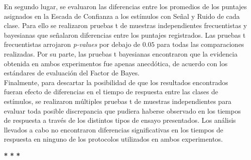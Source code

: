 En segundo lugar, se evaluaron las diferencias entre los promedios de los puntajes asignados en la Escada de Confianza a los estímulos con Señal y Ruido de cada clase. Para ello se realizaron pruebas t de muestras independientes frecuentistas y bayesianas que señalaron diferencias entre los puntajes registrados. Las pruebas t frecuentistas arrojaron \textit{p-values} por debajo de $0.05$ para todas las comparaciones realizadas. Por su parte, las pruebas t bayesianas encontraron que la evidencia obtenida en ambos experimentos fue apenas anecdótica, de acuerdo con los estándares de evaluación del Factor de Bayes.\\

Finalmente, para descartar la posibilidad de que los resultados encontrados fueran efecto de diferencias en el tiempo de respuesta entre las clases de estímulos, se realizaron múltiples pruebas t de muestras independientes para evaluar toda posible discrepancia que pudiera haberse observado en los tiempos de respuesta a través de los distintos tipos de ensayo presentados. Los análisis llevados a cabo no encontraron diferencias significativas en los tiempos de respuesta en ninguno de los protocolos utilizados en ambos experimentos.\\


\begin{center}
\textbf{*} \qquad \textbf{*} \qquad \textbf{*}
\end{center}

